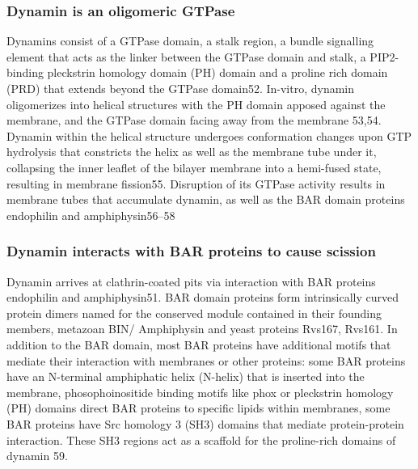		 
		\subsubsection{Dynamin is an oligomeric GTPase}
		Dynamins consist of a GTPase domain, a stalk region, a bundle signalling element that acts as the linker between the GTPase domain and stalk, a PIP2-binding pleckstrin homology domain (PH) domain and a proline rich domain (PRD) that extends beyond the GTPase domain52. In-vitro, dynamin oligomerizes into helical structures with the PH domain apposed against the membrane, and the GTPase domain facing away from the membrane 53,54. Dynamin within the helical structure undergoes conformation changes upon GTP hydrolysis that constricts the helix as well as the membrane tube under it, collapsing the inner leaflet of the bilayer membrane into a hemi-fused state, resulting in membrane fission55. Disruption of its GTPase activity results in membrane tubes that accumulate dynamin, as well as the BAR domain proteins endophilin and amphiphysin56–58

		\subsubsection{Dynamin interacts with BAR proteins to cause scission}
		Dynamin arrives at clathrin-coated pits via interaction with BAR proteins endophilin and amphiphysin51. BAR domain proteins form intrinsically curved protein dimers named for the conserved module contained in their founding members, metazoan BIN/ Amphiphysin and yeast proteins Rvs167, Rvs161. In addition to the BAR domain, most BAR proteins have additional motifs that mediate their interaction with membranes or other proteins: some BAR proteins have an N-terminal amphiphatic helix (N-helix) that is inserted into the membrane, phosophoinositide binding motifs like phox or pleckstrin homology (PH) domains direct BAR proteins to specific lipids within membranes, some BAR proteins have Src homology 3 (SH3) domains that mediate protein-protein interaction. These SH3 regions act as a scaffold for the proline-rich domains of dynamin 59. 


